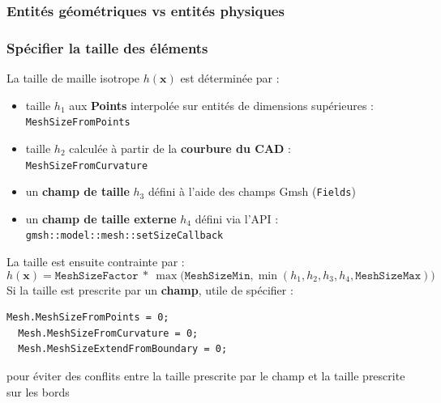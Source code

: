 \documentclass[aspectratio=169]{beamer}
\begin{document}
\begin{frame}[fragile]
\frametitle{Entités géométriques vs entités physiques}

\end{frame}

\begin{frame}[fragile]
\frametitle{Spécifier la taille des éléments}
\footnotesize
La taille de maille isotrope $h(\mathbf{x})$ est déterminée par :
  \begin{itemize}
    \item taille $h_1$ aux \textbf{Points} interpolée sur entités de dimensions supérieures : \texttt{MeshSizeFromPoints}
    \item taille $h_2$ calculée à partir de la \textbf{courbure du CAD} : \texttt{MeshSizeFromCurvature}
    \item un \textbf{champ de taille} $h_3$ défini à l'aide des champs Gmsh (\texttt{Fields})
    \item un \textbf{champ de taille externe} $h_4$ défini via l'API : \texttt{gmsh::model::mesh::setSizeCallback}
  \end{itemize}
  La taille est ensuite contrainte par :
  \begin{equation*}
    h(\mathbf{x}) = \texttt{MeshSizeFactor}~*~\max\biggr( \texttt{MeshSizeMin}, \min\left( h_1, h_2, h_3, h_4, \texttt{MeshSizeMax}\right) \biggr)
  \end{equation*}
  Si la taille est prescrite par un \textbf{champ}, utile de spécifier :
  \begin{lstlisting}[belowskip=0.5mm]
  Mesh.MeshSizeFromPoints = 0;
  Mesh.MeshSizeFromCurvature = 0;
  Mesh.MeshSizeExtendFromBoundary = 0;
  \end{lstlisting}
  pour éviter des conflits entre la taille prescrite par le champ et la taille prescrite sur les bords
\end{frame}
\end{document}
